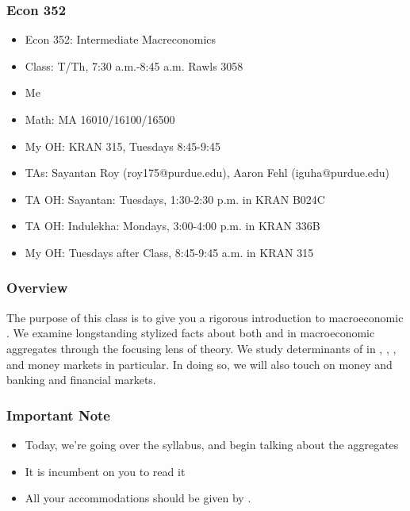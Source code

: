 \documentclass{beamer}
\author{Trevor Gallen}
\date{}
\begin{document}
\renewcommand*{\inserttotalframenumber}{\pageref{lastframe}}



\begin{frame}
\titlepage
\end{frame}

\begin{frame}
\frametitle[alignment=center]{Econ 352}
\begin{itemize}
\item Econ 352: Intermediate Macreconomics
\bigskip
\item Class:  T/Th, 7:30 a.m.-8:45 a.m. Rawls 3058
\bigskip
\item Me
\bigskip
\item Math:  MA 16010/16100/16500
\bigskip
\item My OH:  KRAN 315, Tuesdays 8:45-9:45
\bigskip
\item TAs:  Sayantan Roy (roy175@purdue.edu), Aaron Fehl (iguha@purdue.edu) 
\bigskip
\item TA OH:  Sayantan: Tuesdays, 1:30-2:30 p.m. in KRAN B024C
\item TA OH: Indulekha:   Mondays, 3:00-4:00 p.m. in KRAN 336B
\item My OH:   Tuesdays after Class, 8:45-9:45 a.m. in KRAN 315
\end{itemize}
\end{frame}

\begin{frame}
\frametitle[alignment=center]{Overview}
\linespread{1.6}
\begin{displayquote}
The purpose of this class is to give you a rigorous introduction to macroeconomic {}. We
examine longstanding stylized facts about both {} and {} in macroeconomic aggregates through the focusing lens of theory. We study determinants of {} in {}, {},
{}, and money markets in particular. In doing so, we will also touch on money and banking and financial markets.
\end{displayquote}
\end{frame}

\begin{frame}
\frametitle[alignment=center]{Important Note}
\begin{itemize}
\item Today, we're going over the syllabus, and begin talking about the aggregates
\bigskip
\item It is incumbent on you to read it
\bigskip
\item All your accommodations should be given by {}.
\bigskip
\end{itemize}
\end{frame}
\end{document}
